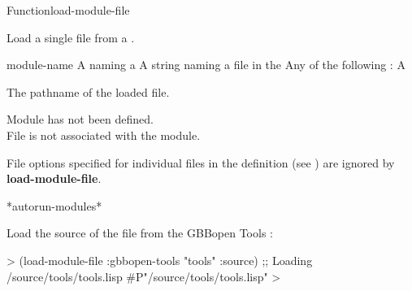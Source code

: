 \documentclass[10pt,twoside,english,pdftex]{article}
\begin{document}
\begin{functiondoc}{Function}{load-module-file}%
  { 
      
    \returns{} }
%
% 

\fnsyntax 

\fnpurpose Load a single file from a .

\fnpackage {}

\fnmodule {}

\fnargs
\begin{args}{module-name}
 A  naming a 
 A string naming a file in the 
\arg[option] Any of the following : 
\loadonefilemoduleoptions
\arg[pathname] A 
\end{args}

\fnreturns The pathname of the loaded file.

\fnerrors Module  has not been defined.\\
%
File  is not associated with the module.

\relativedircircularity

\fndescription File options specified for individual files in the
 definition (see \textbf{}) are
ignored by \textbf{load-module-file}.

\begin{alsos}{*autorun-modules*}
\end{alsos}

\fnexample Load the source of the file  from the GBBopen
Tools :
%
\W\supp
\begin{example}
  > (load-module-file :gbbopen-tools "tools" :source)
  ;; Loading /source/tools/tools.lisp
  #P"/source/tools/tools.lisp"
  >
\end{example}

\end{functiondoc}

\end{document}
